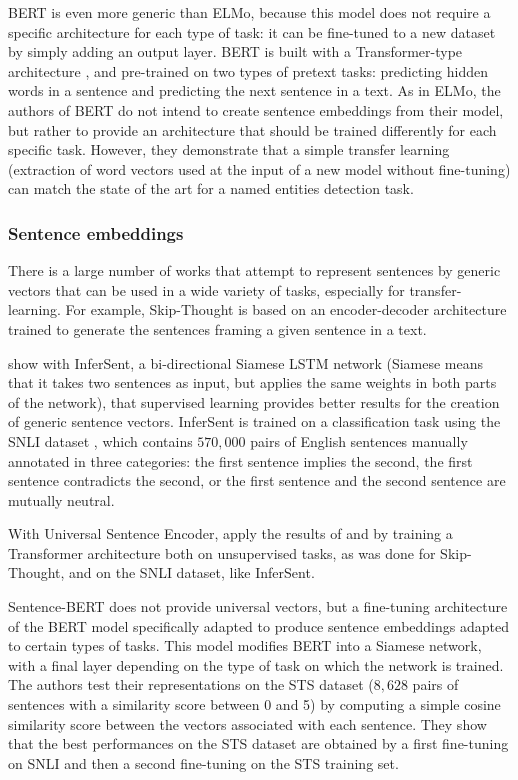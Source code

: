 BERT \cite{devlin2018bert} is even more generic than ELMo, because this model does not require a specific architecture for each type of task: it can be fine-tuned to a new dataset by simply adding an output layer. BERT is built with a Transformer-type architecture \cite{vaswani2017attention}, and pre-trained on two types of pretext tasks: predicting hidden words in a sentence and predicting the next sentence in a text. As in ELMo, the authors of BERT do not intend to create sentence embeddings from their model, but rather to provide an architecture that should be trained differently for each specific task. However, they demonstrate that a simple transfer learning (extraction of  word vectors used at the input of a new model without fine-tuning) can match the state of the art for a named entities detection task.

\subsubsection{Sentence embeddings}
\label{embedding_phrases}
There is a large number of works that attempt to represent sentences by generic vectors that can be used in a wide variety of tasks, especially for transfer-learning. 
For example, Skip-Thought \citep{kiros2015skip} is based on an encoder-decoder architecture trained to generate the sentences framing a given sentence in a text.

\citet{conneau2017supervised} show with InferSent, a bi-directional Siamese LSTM network (Siamese means that it takes two sentences as input, but applies the same weights in both parts of the network), that supervised learning provides better results for the creation of generic sentence vectors. InferSent is trained on a classification task using the SNLI dataset \cite{bowman2015large}, which contains $570,000$ pairs of English sentences manually annotated in three categories: the first sentence implies the second, the first sentence contradicts the second, or the first sentence and the second sentence are mutually neutral.

With Universal Sentence Encoder, \citet{cer2018universal} apply the results of \citet{kiros2015skip} and \citet{conneau2017supervised} by training a Transformer architecture both on unsupervised tasks, as was done for Skip-Thought, and on the SNLI dataset, like InferSent. 

Sentence-BERT \cite{reimers_2019_sentence} does not provide universal vectors, but a fine-tuning architecture of the BERT model specifically adapted to produce sentence embeddings adapted to certain types of tasks. This model modifies BERT into a Siamese network, with a final layer depending on the type of task on which the network is trained. The authors test their representations on the STS dataset \cite{cer2017semeval} ($8,628$ pairs of sentences with a similarity score between 0 and 5) by computing a simple cosine similarity score between the vectors associated with each sentence. They show that the best performances on the STS dataset are obtained by a first fine-tuning on SNLI and then a second fine-tuning on the STS training set.

